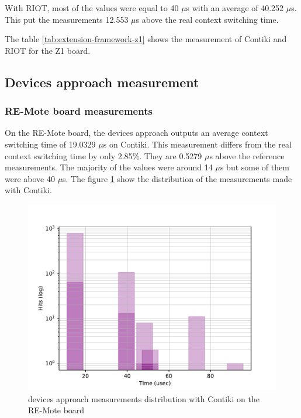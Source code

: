 With RIOT, most of the values were equal to 40 $\mu$s with an average of 40.252 $\mu$s.
This put the measurements 12.553 $\mu$s above the real context switching time.

The table \ref{tab:extension-framework-z1} shows the measurement of Contiki and RIOT for the Z1 board.



\subsection{Devices approach measurement}

\subsubsection{RE-Mote board measurements}
On the RE-Mote board, the devices approach outputs an average context switching time of 19.0329 $\mu$s on Contiki.
This measurement differs from the real context switching time by only 2.85$\%$.
They are 0.5279 $\mu$s above the reference measurements.
The majority of the values were around 14 $\mu$s but some of them were above 40 $\mu$s.
The figure \ref{fig:devices-framework-contiki-remote} show the distribution of the measurements made with Contiki.

\begin{figure}[!ht]
      \centering
      \includegraphics[scale=.7]{assets/devices-framework-contiki-remote.pdf}
      \caption{devices approach measurements distribution with Contiki on the RE-Mote board\label{fig:devices-framework-contiki-remote}}
\end{figure}

